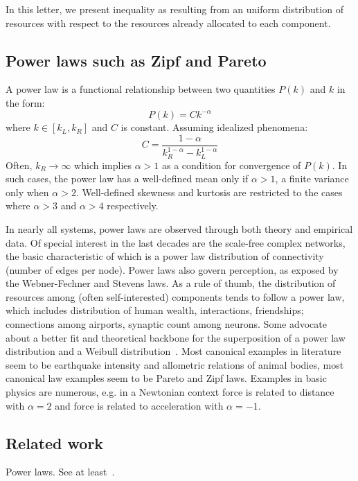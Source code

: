 \documentclass[a4paper, 11pt]{article} %
\begin{document}
In this letter, we present inequality as resulting from
an uniform distribution of resources with
respect to the resources already allocated to each component.


\subsection{Power laws such as Zipf and Pareto}
A power law is a functional relationship between two quantities $P(k)$ and $k$ in the form:
\begin{equation}\label{eq:pow}
P(k) = Ck^{-\alpha}
\end{equation}
\noindent where $k\in [k_L,k_R]$
and $C$ is constant.
Assuming idealized phenomena:
\begin{equation}
C=\frac{1-\alpha}{k_R^{1-\alpha}-k_L^{1-\alpha}}
\end{equation}
\noindent Often, $k_R\rightarrow \infty$ which implies $\alpha>1$ as a condition for convergence of $P(k)$.
In such cases, the power law has a well-defined mean only if $\alpha>1$,
a finite variance only when $\alpha>2$. Well-defined skewness and kurtosis are restricted
to the cases where $\alpha>3$ and $\alpha>4$ respectively.

In nearly all systems, power laws are observed through both theory and empirical data.
Of special interest in the last decades are the scale-free complex networks,
the basic characteristic of which is a power law distribution of connectivity (number of edges per node).
Power laws also govern perception, as exposed by the Webner-Fechner and Stevens laws.
As a rule of thumb, the distribution of resources among (often self-interested) components
tends to follow a power law,
which includes distribution of human wealth, interactions, friendships;
connections among airports, synaptic count among neurons.
Some advocate 
about a better fit and theoretical backbone for the superposition of a
 power law distribution and a Weibull distribution~\cite{powWeib}.
 Most canonical examples in literature seem to be earthquake intensity and allometric relations of animal bodies,
 most canonical law examples seem to be Pareto and Zipf laws.
 Examples in basic physics are numerous, e.g. in a Newtonian context force is related to distance with $\alpha=2$ and force is related to acceleration with $\alpha=-1$.

\subsection{Related work}
Power laws. See at least~\cite{part,pbook}.
\end{document}
